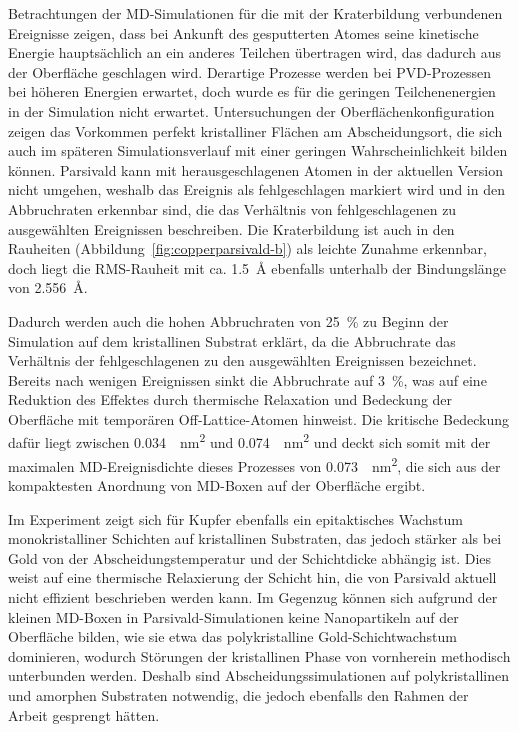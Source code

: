 Betrachtungen der MD-Simulationen für die mit der Kraterbildung verbundenen Ereignisse zeigen, dass bei Ankunft des gesputterten Atomes seine kinetische Energie hauptsächlich an ein anderes Teilchen übertragen wird, das dadurch aus der Oberfläche geschlagen wird.
Derartige Prozesse werden bei PVD-Prozessen bei höheren Energien erwartet\cite{mattox_handbook_2010}, doch wurde es für die geringen Teilchenenergien in der Simulation nicht erwartet.
Untersuchungen der Oberflächenkonfiguration zeigen das Vorkommen perfekt kristalliner Flächen am Abscheidungsort, die sich auch im späteren Simulationsverlauf mit einer geringen Wahrscheinlichkeit bilden können.
Parsivald kann mit herausgeschlagenen Atomen in der aktuellen Version nicht umgehen, weshalb das Ereignis als fehlgeschlagen markiert wird und in den Abbruchraten erkennbar sind, die das Verhältnis von fehlgeschlagenen zu ausgewählten Ereignissen beschreiben.
Die Kraterbildung ist auch in den Rauheiten (Abbildung~\ref{fig:copperparsivald-b}) als leichte Zunahme erkennbar, doch liegt die RMS-Rauheit mit ca. \SI{1.5}{\angstrom} ebenfalls unterhalb der Bindungslänge von \SI{2.556}{\angstrom}.

Dadurch werden auch die hohen Abbruchraten von \SI{25}{\percent} zu Beginn der Simulation auf dem kristallinen Substrat erklärt, da die Abbruchrate das Verhältnis der fehlgeschlagenen zu den ausgewählten Ereignissen bezeichnet.
Bereits nach wenigen Ereignissen sinkt die Abbruchrate auf \SI{3}{\percent}, was auf eine Reduktion des Effektes durch thermische Relaxation und Bedeckung der Oberfläche mit temporären Off-Lattice-Atomen hinweist.
Die kritische Bedeckung dafür liegt zwischen \SI{0.034}{\per\nano\meter\squared} und \SI{0.074}{\per\nano\meter\squared} und deckt sich somit mit der maximalen MD-Ereignisdichte dieses Prozesses von \SI{0.073}{\per\nano\meter\squared}, die sich aus der kompaktesten Anordnung von MD-Boxen auf der Oberfläche ergibt.

Im Experiment zeigt sich für Kupfer ebenfalls ein epitaktisches Wachstum monokristalliner Schichten auf kristallinen Substraten, das jedoch stärker als bei Gold von der Abscheidungstemperatur und der Schichtdicke abhängig ist\cite{gottsche_uber_1956}.
Dies weist auf eine thermische Relaxierung der Schicht hin, die von Parsivald aktuell nicht effizient beschrieben werden kann.
Im Gegenzug können sich aufgrund der kleinen MD-Boxen in Parsivald-Simulationen keine Nanopartikeln auf der Oberfläche bilden, wie sie etwa das polykristalline Gold-Schichtwachstum dominieren, wodurch Störungen der kristallinen Phase von vornherein methodisch unterbunden werden.
Deshalb sind Abscheidungssimulationen auf polykristallinen und amorphen Substraten notwendig, die jedoch ebenfalls den Rahmen der Arbeit gesprengt hätten.

